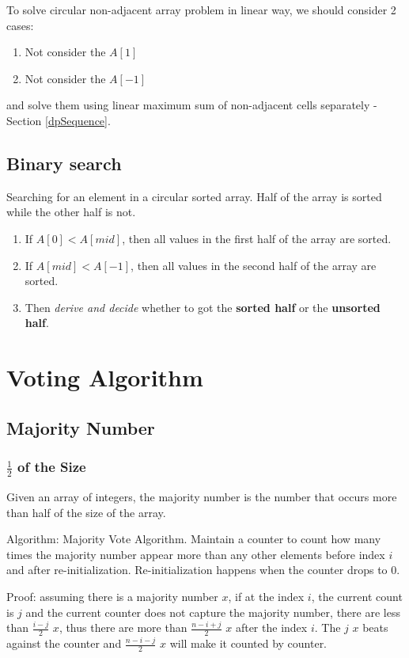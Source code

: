 To solve circular non-adjacent array problem in linear way, we should consider 2 cases:
\begin{enumerate}
\item Not consider the $A[1]$
\item Not consider the $A[-1]$ 
\end{enumerate}
and solve them using linear maximum sum of non-adjacent cells separately  - Section \ref{dpSequence}. 
\subsection{Binary search}
Searching for an element in a circular sorted array. Half of the array is sorted while the other half is not.
\begin{enumerate}
\item If $A[0] < A[mid]$, then all values in the first half of the array are sorted.
\item If $A[mid] < A[-1]$, then all values in the second half of the array are sorted.
\item Then \textit{derive and decide} whether to got the \textbf{sorted half} or the \textbf{unsorted half}.
\end{enumerate}
\section{Voting Algorithm}
\subsection{Majority Number}
\subsubsection{$\frac{1}{2}$ of the Size}
Given an array of integers, the majority number is the number that occurs more than half of the size of the array. 

Algorithm: Majority Vote Algorithm. Maintain a counter to count how many times the majority number appear more than any other elements before index $i$ and after re-initialization. Re-initialization happens when the counter drops to 0. 

Proof: assuming there is a majority number $x$, if at the index $i$, the current count is $j$ and the current counter does not capture the majority number, there are less than $\frac{i-j}{2}$ $x$, thus there are more than $\frac{n-i+j}{2}$ $x$ after the index $i$. The $j$ $x$ beats against the counter and $\frac{n-i-j}{2}$ $x$ will make it counted by counter. 

